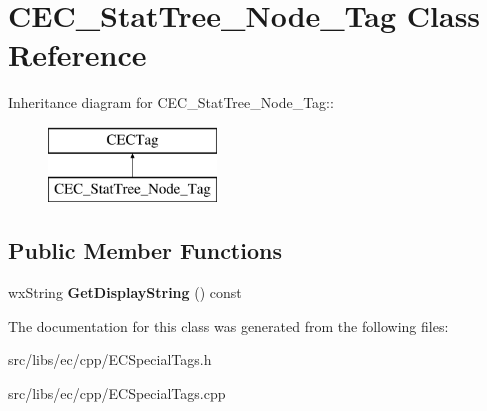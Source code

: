 \section{CEC\_\-StatTree\_\-Node\_\-Tag Class Reference}
\label{classCEC__StatTree__Node__Tag}
Inheritance diagram for CEC\_\-StatTree\_\-Node\_\-Tag::\begin{figure}[H]
\begin{center}
\leavevmode
\includegraphics[height=2cm]{classCEC__StatTree__Node__Tag}
\end{center}
\end{figure}
\subsection*{Public Member Functions}
\begin{DoxyCompactItemize}
\item 
wxString {\bfseries GetDisplayString} () const \label{classCEC__StatTree__Node__Tag_a53dc4018072c5253cb468296fac5260e}

\end{DoxyCompactItemize}


The documentation for this class was generated from the following files:\begin{DoxyCompactItemize}
\item 
src/libs/ec/cpp/ECSpecialTags.h\item 
src/libs/ec/cpp/ECSpecialTags.cpp\end{DoxyCompactItemize}
